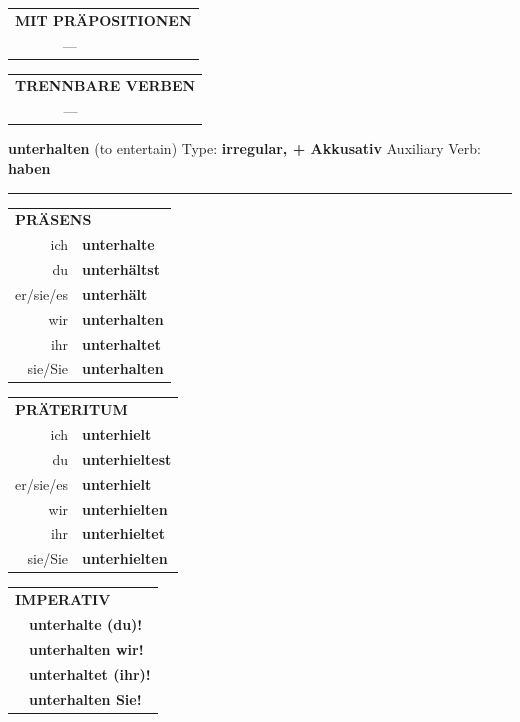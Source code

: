 \documentclass[10pt,a4paper]{revtex4-2}
\begin{document}
\begin{verbbox-acc}
\vspace{10pt}

\begin{tabular}{lll}
\multicolumn{3}{l}{\textbf{MIT PRÄPOSITIONEN}}\\
& ---\\
\end{tabular}
\hfill
\begin{tabular}{lll}
\multicolumn{3}{l}{\textbf{TRENNBARE VERBEN}}\\
& ---\\
\end{tabular}

\vspace{-5pt}
\end{verbbox-acc}

\begin{verbbox-acc}
{\Large \bf unterhalten} (to entertain) \hfill Type: \textbf{irregular, + Akkusativ} \hfill Auxiliary Verb: \textbf{haben}

\vspace{5pt}
\hrule
\vspace{5pt}

\begin{tabular}{rl}
\multicolumn{2}{l}{\textbf{PRÄSENS}}\\
ich & \textbf{unterhalte}\\
du & \textbf{unterhältst}\\
er/sie/es & \textbf{unterhält}\\
wir & \textbf{unterhalten}\\
ihr & \textbf{unterhaltet}\\
sie/Sie & \textbf{unterhalten}\\
\end{tabular}
\hfill
\begin{tabular}{rl}
\multicolumn{2}{l}{\textbf{PRÄTERITUM}}\\
ich & \textbf{unterhielt}\\
du & \textbf{unterhieltest}\\
er/sie/es & \textbf{unterhielt}\\
wir & \textbf{unterhielten}\\
ihr & \textbf{unterhieltet}\\
sie/Sie & \textbf{unterhielten}\\
\end{tabular}
\hfill
\begin{tabular}{rl}
\multicolumn{2}{l}{\textbf{IMPERATIV}}\\
& \textbf{unterhalte (du)!}\\
& \textbf{unterhalten wir!}\\
& \textbf{unterhaltet (ihr)!}\\
& \textbf{unterhalten Sie!}\\
\end{tabular}


\end{verbbox-acc}
\end{document}
